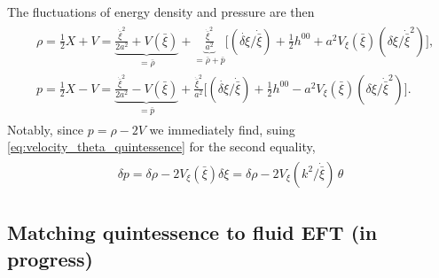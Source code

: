 The fluctuations of energy density and pressure are then
{\small\begin{align}
\begin{aligned}
    &\rho = \tfrac12 X + V = \underbrace{\tfrac{\dot{\bar{\xi}}^2}{2a^2}+ V(\bar{\xi})}_{=\bar{\rho}} + \underbrace{\tfrac{\dot{\bar{\xi}}^2}{a^2}}_{=\bar{\rho}+\bar{p}}\bigg[(\dot{\delta\xi}/\dot{\bar{\xi}})+\tfrac12 h^{00} + a^2V_\xi(\bar{\xi})(\delta\xi/\dot{\bar{\xi}}^2) \bigg],
    \\[3pt]
    &p= \tfrac12 X - V = \underbrace{\tfrac{\dot{\bar{\xi}}^2}{2a^2}- V(\bar{\xi})}_{=\bar{p}} + \tfrac{\dot{\bar{\xi}}^2}{a^2}\bigg[(\dot{\delta\xi}/\dot{\bar{\xi}})+\tfrac12 h^{00} - a^2V_\xi(\bar{\xi})(\delta\xi/\dot{\bar{\xi}}^2) \bigg].
\end{aligned}
\end{align}}
Notably, since $p=\rho-2V$ we immediately find, suing \eqref{eq:velocity_theta_quintessence} for the second equality,
{\small\begin{align}\label{eq:pressure_perturbations_quintessence}
\begin{aligned}
    \delta p =\delta \rho -2V_\xi(\bar{\xi})\delta\xi = \delta \rho -2 V_\xi (k^2/\dot{\bar{\xi}})\,\theta
\end{aligned}\end{align}}


\subsection{Matching quintessence to fluid EFT {\color{red}(in progress)}}

